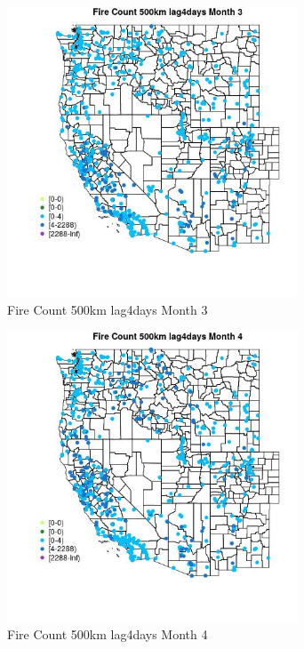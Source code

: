 \begin{figure} 
\centering  
\includegraphics[width=0.77\textwidth]{Code_Outputs/Report_ML_input_PM25_Step4_part_e_de_duplicated_aves_compiled_2019-05-21wNAs_MapObsMo3Fire_Count_500km_lag4days.jpg} 
\caption{\label{fig:Report_ML_input_PM25_Step4_part_e_de_duplicated_aves_compiled_2019-05-21wNAsMapObsMo3Fire_Count_500km_lag4days}Fire Count 500km lag4days Month 3} 
\end{figure} 
 

\begin{figure} 
\centering  
\includegraphics[width=0.77\textwidth]{Code_Outputs/Report_ML_input_PM25_Step4_part_e_de_duplicated_aves_compiled_2019-05-21wNAs_MapObsMo4Fire_Count_500km_lag4days.jpg} 
\caption{\label{fig:Report_ML_input_PM25_Step4_part_e_de_duplicated_aves_compiled_2019-05-21wNAsMapObsMo4Fire_Count_500km_lag4days}Fire Count 500km lag4days Month 4} 
\end{figure} 
 

